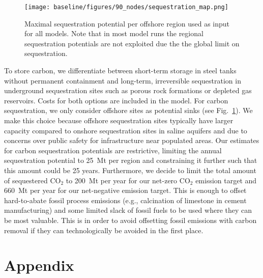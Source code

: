 \documentclass[twocolumn]{article}
\newcommand{\COtwo}{CO$_2$}
\newcommand{\carbon}{CO$_2$}
\begin{document}

\begin{figure}[h!]
    \centering
    \texttt{[image: baseline/figures/90\_nodes/sequestration\_map.png]}
    \caption{Maximal sequestration potential per offshore region used as input for all models. Note that in most model runs the regional sequestration potentials are not exploited due the the global limit on sequestration.}
    \label{fig:sequestration_map}
\end{figure}

To store carbon, we differentiate between short-term storage in steel tanks without permanent containment and long-term, irreversible sequestration in underground sequestration sites such as porous rock formations or depleted gas reservoirs.
Costs for both options are included in the model.
For carbon sequestration, we only consider offshore sites as potential sinks (see Fig.~\ref{fig:sequestration_map}).
We make this choice because offshore sequestration sites typically have larger capacity compared to onshore sequestration sites in saline aquifers and due to concerns over public safety for infrastructure near populated areas.
Our estimates for carbon sequestration potentials are restrictive, limiting the annual sequestration potential to 25~Mt per region and constraining it further such that this amount could be  25 years.
Furthermore, we decide to limit the total amount of sequestered \COtwo{} to 200~Mt per year for our net-zero \carbon{} emission target and 660~Mt per year for our net-negative emission target.
This is enough to offset hard-to-abate fossil process emissions (e.g., calcination of limestone in cement manufacturing) and some limited slack of fossil fuels to be used where they can be most valuable.
This is in order to avoid offsetting fossil emissions with carbon removal if they can technologically be avoided in the first place.


\printbibliography

\newpage
\appendix
\setcounter{section}{0}
\renewcommand{\thesection}{\Alph{section}}
\renewcommand{\thefigure}{\Alph{section}.\arabic{figure}} %

\onecolumn %

\section*{Appendix}
\end{document}

